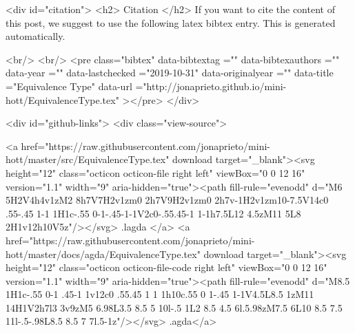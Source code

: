   
  <div id="citation">
  <h2> Citation </h2>
  If you want to cite the content of this post,
  we suggest to use the following latex bibtex entry.
  This is generated automatically.

  <br/>
  <br/>
  <pre class="bibtex"
       data-bibtextag =""
       data-bibtexauthors =""
       data-year =""
       data-lastchecked ="2019-10-31"
       data-originalyear =""
       data-title ="Equivalence Type"
       data-url ="http://jonaprieto.github.io/mini-hott/EquivalenceType.tex"
  ></pre>
  </div>
  

  <div id="github-links">
    <div class="view-source">
      
        <a href="https://raw.githubusercontent.com/jonaprieto/mini-hott/master/src/EquivalenceType.tex" download target="_blank"><svg height="12" class="octicon octicon-file right left" viewBox="0 0 12 16" version="1.1" width="9" aria-hidden="true"><path fill-rule="evenodd" d="M6 5H2V4h4v1zM2 8h7V7H2v1zm0 2h7V9H2v1zm0 2h7v-1H2v1zm10-7.5V14c0 .55-.45 1-1 1H1c-.55 0-1-.45-1-1V2c0-.55.45-1 1-1h7.5L12 4.5zM11 5L8 2H1v12h10V5z"/></svg> .lagda </a>
        <a href="https://raw.githubusercontent.com/jonaprieto/mini-hott/master/docs/agda/EquivalenceType.tex" download target="_blank"><svg height="12" class="octicon octicon-file-code right left" viewBox="0 0 12 16" version="1.1" width="9" aria-hidden="true"><path fill-rule="evenodd" d="M8.5 1H1c-.55 0-1 .45-1 1v12c0 .55.45 1 1 1h10c.55 0 1-.45 1-1V4.5L8.5 1zM11 14H1V2h7l3 3v9zM5 6.98L3.5 8.5 5 10l-.5 1L2 8.5 4.5 6l.5.98zM7.5 6L10 8.5 7.5 11l-.5-.98L8.5 8.5 7 7l.5-1z"/></svg> .agda</a>
      
